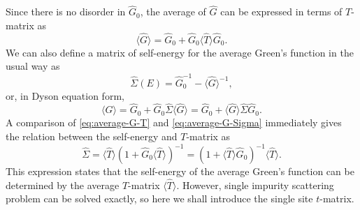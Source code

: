 \documentclass{book}
\newcommand{\average}[1]{\langle#1\rangle}
\numberwithin{equation}{section}
\begin{document}
Since there is no disorder in $\hat{G}_0$, the average of $\hat{G}$
can be expressed in terms of $T$-matrix as
\begin{equation}
  \label{eq:average-G-T}
  \average{\hat{G}}=\hat{G}_0+\hat{G}_0\average{\hat{T}}\hat{G}_0.
\end{equation}
We can also define a matrix of self-energy for the average Green's
function in the usual way as
\begin{equation}
  \hat{\Sigma}(E)=\hat{G}_0^{-1}-\average{\hat{G}}^{-1},
\end{equation}
or, in Dyson equation form, 
\begin{equation}
  \label{eq:average-G-Sigma}
  \average{\hat{G}}=\hat{G}_0+\hat{G}_0\hat{\Sigma}\average{\hat{G}}=
  \hat{G}_0+\average{\hat{G}}\hat{\Sigma}\hat{G}_0.
\end{equation}
A comparison of \eqref{eq:average-G-T} and \eqref{eq:average-G-Sigma}
immediately gives the relation between the self-energy and $T$-matrix
as
\begin{equation}
  \label{eq:average-sigma-T}
  \hat{\Sigma}=\average{\hat{T}}(1+\hat{G}_0\average{\hat{T}})^{-1}=
  (1+\average{\hat{T}}\hat{G}_0)^{-1}\average{\hat{T}}.
\end{equation}
This expression states that the self-energy of the average Green's
function can be determined by the average $T$-matrix
$\average{\hat{T}}$. However, single impurity scattering problem can
be solved exactly, so here we shall introduce the single site
$t$-matrix.
\end{document}
